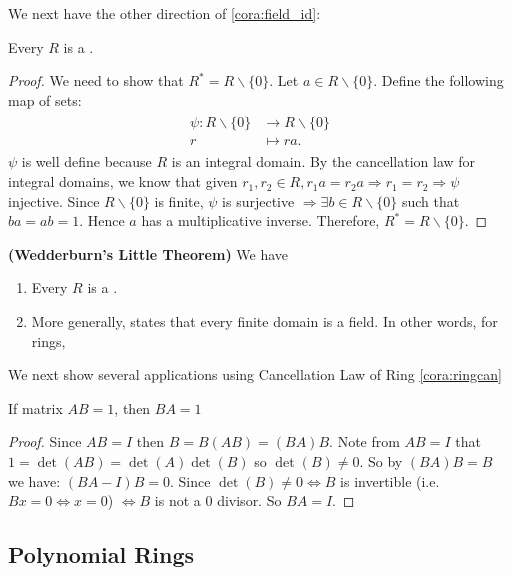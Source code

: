 \documentclass{article}
\newcommand{\bfs}[1]{\textbf{({#1}) }}
\begin{document}
We next have the other direction of \cref{cora:field_id}:
\begin{thma}
Every  $R$ is a .
\end{thma} 
\begin{proof}
We need to show that $R^{*}=R \backslash\{0\}$. Let $a \in R \backslash\{0\}$. Define the following map of sets:
\begin{align*}
\begin{aligned}
\psi: R \backslash\{0\} & \rightarrow R \backslash\{0\} \\
r & \mapsto r a .
\end{aligned}
\end{align*}
$\psi$ is well define because $R$ is an integral domain. By the cancellation law for integral domains, we know that given $r_{1}, r_{2} \in R, r_{1} a=r_{2} a \Rightarrow r_{1}=r_{2} \Rightarrow \psi$ injective. Since $R \backslash\{0\}$ is finite, $\psi$ is surjective $\Rightarrow \exists b \in R \backslash\{0\}$ such that $b a=a b=1$. Hence $a$ has a multiplicative inverse. Therefore, $R^{*}=R \backslash\{0\}$.
\end{proof}
\begin{cora}\bfs{Wedderburn's Little Theorem}\label{cor:ndnad}We have
\begin{enumerate}
\item Every  $R$ is a . 
    \item More generally,  states that every finite domain is a field. In other words, for  rings, 
\end{enumerate}
\end{cora}



We next show several applications using Cancellation Law of Ring \cref{cora:ringcan}
\begin{lema}
If matrix $AB=1$, then $BA=1$
\end{lema}
\begin{proof}
Since $A B=I$ then $B=B(A B)=(B A) B$. Note from $A B=I$ that $1=\operatorname{det}(A B)=\operatorname{det}(A) \operatorname{det}(B)$ so $\operatorname{det}(B) \neq 0$.
So by $(B A) B=B$ we have:
$(B A-I) B=0$. Since $\operatorname{det}(B) \neq 0\Leftrightarrow B$ is invertible (i.e. $Bx=0\Leftrightarrow x=0$) $\Leftrightarrow B$ is not a 0 divisor. So $B A=I$.
\end{proof}
\subsection{Polynomial Rings}
\end{document}
